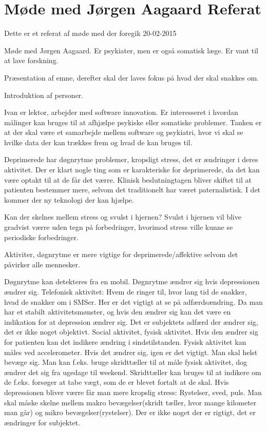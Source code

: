 \chapter{Møde med Jørgen Aagaard Referat}\label{app:moede-med-janne-referat}

Dette er et referat af møde med \citet{misc:jorgen-aagaard} der foregik 20-02-2015

Møde med Jørgen Aagaard. Er psykiater, men er også somatisk læge. Er vant til at lave forskning.

Præsentation af emne, derefter skal der laves fokus på hvad der skal snakkes om.

Introduktion af personer.

Ivan er lektor, arbejder med software innovation. Er interesseret i hvordan målinger kan bruges til at afhjælpe psykiske eller somatiske problemer. Tanken er at der skal være et samarbejde mellem software og psykiatri, hvor vi skal se hvilke data der kan trækkes frem og hvad de kan bruges til.

Deprimerede har døgnrytme problemer, kropsligt stress, det er ændringer i deres aktivitet. Der er klart nogle ting som er karakteriske for deprimerede, da det kan være optakt til at de får det værre. Klinisk beslutningtagen bliver skiftet til at patienten bestemmer mere, selvom det traditionelt har været paternalistisk. I det kommer der ny teknologi der kan hjælpe.

Kan der skelnes mellem stress og svulst i hjernen?
Svulst i hjernen vil blive gradvist værre uden tegn på forbedringer, hvorimod stress ville kunne se periodiske forbedringer.

Aktiviter, døgnrytme er mere vigtige for deprimerede/affektive selvom det påvirker alle mennesker. 

Døgnrytme kan detekteres fra en mobil. Døgnrytme ændrer sig hvis depressionen ændrer sig. 
Telefonisk aktivitet: Hvem de ringer til, hvor lang tid de snakker, hvad de snakker om i SMSer. Her er det vigtigt at se på adfærdsændring. Da man har et stabilt aktivitetsmønster, og hvis den ændrer sig kan det være en indikation for at depression ændrer sig. Det er subjektets adfærd der ændrer sig, det er ikke noget objektivt. 
Social aktivitet, fysisk aktivitet. Hvis den ændrer sig for patienten kan det indikere ændring i sindstilstanden. 
Fysisk aktivitet kan måles ved accelerometer. Hvis det ændrer sig, igen er det vigtigt. Man skal helst bevæge sig. Man kan f.eks. bruge skridttæller til at måle fysisk aktivitet, dog ændrer det sig fra ugedage til weekend. Skridttæller kan bruges til at indikere om de f.eks. forsøger at tabe vægt, som de er blevet fortalt at de skal. Hvis depressionen bliver værre får man mere kropslig stress: Rystelser, sved, puls. Man skal måske skelne mellem makro bevægelser(skridt tæller, hvor mange kilometer man går) og mikro bevægelser(rystelser). Der er ikke noget der er rigtigt, det er ændringer for subjektet.

